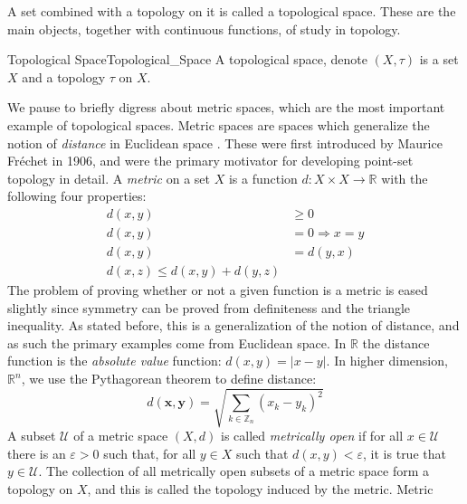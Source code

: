     A set combined with a topology on it is called a topological space. These
    are the main objects, together with continuous functions, of study in
    topology.
    \begin{fdefinition}{Topological Space}{Topological_Space}
        A \gls{topological space}, denote $(X,\tau)$ is a \gls{set} $X$ and a
        \gls{topology} $\tau$ on $X$.
    \end{fdefinition}
    We pause to briefly digress about metric spaces, which are the most
    important example of topological spaces. Metric spaces are spaces which
    generalize the notion of \textit{distance} in Euclidean space%
    . These were first introduced by
    Maurice Fr\'{e}chet in 1906, and were the primary motivator for developing
    point-set topology in detail. A \textit{metric} on a set $X$
    is a function $d:X\times{X}\rightarrow\mathbb{R}$ with the following four
    properties:
    \begin{align}
        d(x,y)&\geq{0}
        \tag{Positivity}\\
        d(x,y)&=0\Longrightarrow{x=y}
        \tag{Definiteness}\\
        d(x,y)&=d(y,x)
        \tag{Symmetry}\\
        d(x,z)\leq{d}(x,y)+d(y,z)
        \tag{Triangle Inequality}
    \end{align}
    The problem of proving whether or not a given function is a metric is eased
    slightly since symmetry can be proved from definiteness and the triangle
    inequality. As stated before, this is a generalization of the notion of
    distance, and as such the primary examples come from Euclidean space. In
    $\mathbb{R}$ the distance function is the \textit{absolute value} function:
    $d(x,y)=|x-y|$. In higher dimension, $\mathbb{R}^{n}$, we use the
    Pythagorean theorem to define distance:
    \begin{equation}
        d(\mathbf{x},\mathbf{y})
        =\sqrt{\sum_{k\in\mathbb{Z}_{n}}(x_{k}-y_{k})^{2}}
    \end{equation}
    A subset $\mathcal{U}$ of a metric space $(X,d)$ is called
    \textit{metrically open} if for all $x\in\mathcal{U}$ there is an
    $\varepsilon>0$ such that, for all $y\in{X}$ such that $d(x,y)<\varepsilon$,
    it is true that $y\in\mathcal{U}$. The collection of all metrically open
    subsets of a metric space form a topology on $X$, and this is called the
    topology induced by the metric. Metric
